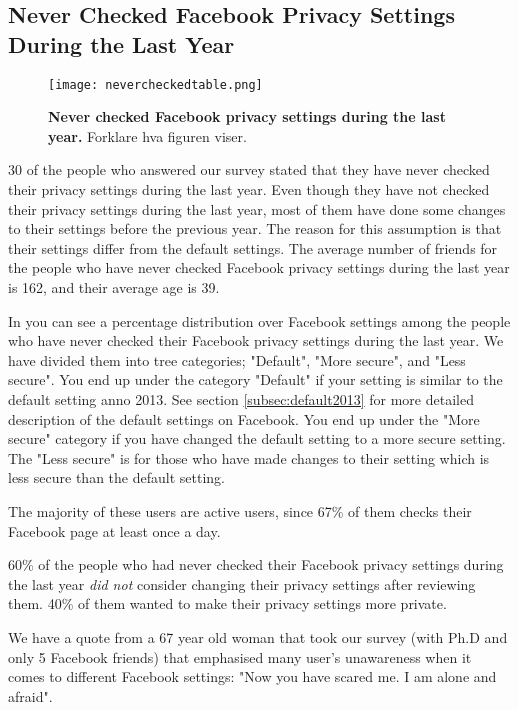\subsection{Never Checked Facebook Privacy Settings During the Last Year}

\begin{figure}[h!]
\centering
\texttt{[image: nevercheckedtable.png]}
\caption[Never checked Facebook privacy settings during the last year]{\textbf{Never checked Facebook privacy settings during the last year.} Forklare hva figuren viser.} 
\label{fig:neverchecked}
\end{figure}

30 of the people who answered our survey stated that they have never checked their privacy settings during the last year. Even though they have not checked their privacy settings during the last year, most of them have done some changes to their settings before the previous year. The reason for this assumption is that their settings differ from the default settings.  
The average number of friends for the people who have never checked Facebook privacy settings during the last year is 162, and their average age is 39. 

In  you can see a percentage distribution over Facebook settings among the people who have never checked their Facebook privacy settings during the last year. We have divided them into tree categories; "Default", "More secure", and "Less secure". You end up under the category "Default" if your setting is similar to the default setting anno 2013. See section \ref{subsec:default2013} for more detailed description of the default settings on Facebook. You end up under the "More secure" category if you have changed the default setting to a more secure setting. The "Less secure" is for those who have made changes to their setting which is less secure than the default setting. 

The majority of these users are active users, since 67\% of them checks their Facebook page at least once a day. 

60\% of the people who had never checked their Facebook privacy settings during the last year \textit{did not} consider changing their privacy settings after reviewing them. 40\% of them wanted to make their privacy settings more private. 

We have a quote from a 67 year old woman that took our survey (with Ph.D and only 5 Facebook friends) that emphasised many user's unawareness when it comes to different Facebook settings: "Now you have scared me. I am alone and afraid".

